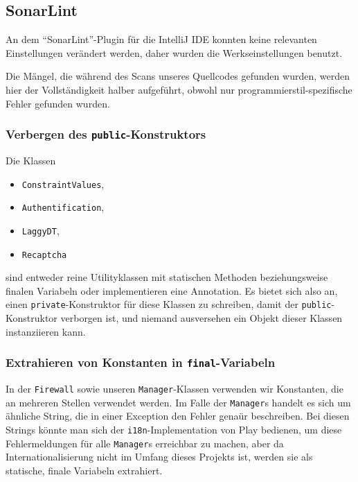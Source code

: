 \documentclass[12pt,DIV14,BCOR10mm,a4paper,parskip=half-,headsepline,headinclude,english,ngerman,bibliography=totocnumbered]{scrreprt}
\begin{document}
\subsection{SonarLint}

An dem \enquote{SonarLint}-Plugin für die IntelliJ IDE konnten keine relevanten Einstellungen verändert werden, daher wurden die Werkseinstellungen benutzt.

Die Mängel, die während des Scans unseres Quellcodes gefunden wurden, werden hier der Vollständigkeit halber aufgeführt, obwohl nur programmierstil-spezifische Fehler gefunden wurden.

\subsubsection{Verbergen des \texttt{public}-Konstruktors}

Die Klassen

\begin{itemize}
  \item \texttt{ConstraintValues},
  \item \texttt{Authentification},
  \item \texttt{LaggyDT},
  \item \texttt{Recaptcha}
\end{itemize}

sind entweder reine Utilityklassen mit statischen Methoden beziehungsweise finalen Variabeln oder implementieren eine Annotation.
Es bietet sich also an, einen \texttt{private}-Konstruktor für diese Klassen zu schreiben, damit der \texttt{public}-Konstruktor verborgen ist, und niemand ausversehen ein Objekt dieser Klassen instanziieren kann.

\subsubsection{Extrahieren von Konstanten in \texttt{final}-Variabeln}

In der \texttt{Firewall} sowie unseren \texttt{Manager}-Klassen verwenden wir Konstanten, die an mehreren Stellen verwendet werden.
Im Falle der \texttt{Manager}s handelt es sich um ähnliche String, die in einer Exception den Fehler genaür beschreiben.
Bei diesen Strings könnte man sich der \texttt{i18n}-Implementation von Play bedienen, um diese Fehlermeldungen für alle \texttt{Manager}s erreichbar zu machen, aber da Internationalisierung nicht im Umfang dieses Projekts ist, werden sie als statische, finale Variabeln extrahiert.
\end{document}
